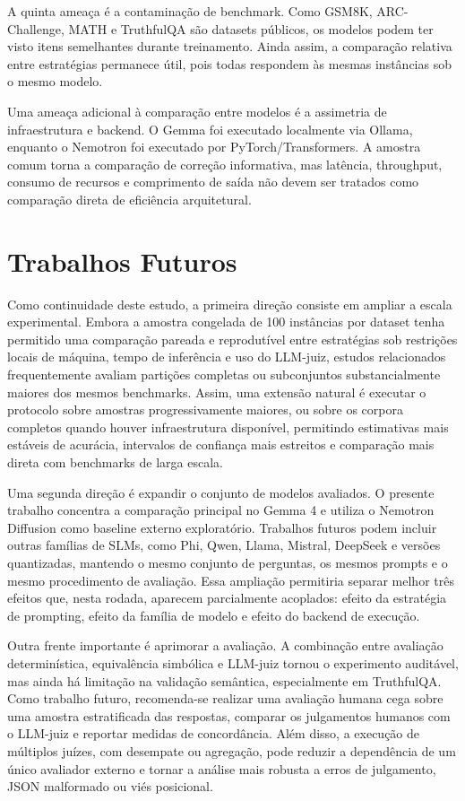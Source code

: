 \documentclass[12pt]{article}
\begin{document}
A quinta ameaça é a contaminação de benchmark. Como GSM8K, ARC-Challenge, MATH e TruthfulQA são datasets públicos, os modelos podem ter visto itens semelhantes durante treinamento. Ainda assim, a comparação relativa entre estratégias permanece útil, pois todas respondem às mesmas instâncias sob o mesmo modelo.

Uma ameaça adicional à comparação entre modelos é a assimetria de infraestrutura e backend. O Gemma foi executado localmente via Ollama, enquanto o Nemotron foi executado por PyTorch/Transformers. A amostra comum torna a comparação de correção informativa, mas latência, throughput, consumo de recursos e comprimento de saída não devem ser tratados como comparação direta de eficiência arquitetural.


\section{Trabalhos Futuros}

Como continuidade deste estudo, a primeira direção consiste em ampliar a escala experimental. Embora a amostra congelada de 100 instâncias por dataset tenha permitido uma comparação pareada e reprodutível entre estratégias sob restrições locais de máquina, tempo de inferência e uso do LLM-juiz, estudos relacionados frequentemente avaliam partições completas ou subconjuntos substancialmente maiores dos mesmos benchmarks. Assim, uma extensão natural é executar o protocolo sobre amostras progressivamente maiores, ou sobre os corpora completos quando houver infraestrutura disponível, permitindo estimativas mais estáveis de acurácia, intervalos de confiança mais estreitos e comparação mais direta com benchmarks de larga escala.

Uma segunda direção é expandir o conjunto de modelos avaliados. O presente trabalho concentra a comparação principal no Gemma 4 e utiliza o Nemotron Diffusion como baseline externo exploratório. Trabalhos futuros podem incluir outras famílias de SLMs, como Phi, Qwen, Llama, Mistral, DeepSeek e versões quantizadas, mantendo o mesmo conjunto de perguntas, os mesmos prompts e o mesmo procedimento de avaliação. Essa ampliação permitiria separar melhor três efeitos que, nesta rodada, aparecem parcialmente acoplados: efeito da estratégia de prompting, efeito da família de modelo e efeito do backend de execução.

Outra frente importante é aprimorar a avaliação. A combinação entre avaliação determinística, equivalência simbólica e LLM-juiz tornou o experimento auditável, mas ainda há limitação na validação semântica, especialmente em TruthfulQA. Como trabalho futuro, recomenda-se realizar uma avaliação humana cega sobre uma amostra estratificada das respostas, comparar os julgamentos humanos com o LLM-juiz e reportar medidas de concordância. Além disso, a execução de múltiplos juízes, com desempate ou agregação, pode reduzir a dependência de um único avaliador externo e tornar a análise mais robusta a erros de julgamento, JSON malformado ou viés posicional.
\end{document}
